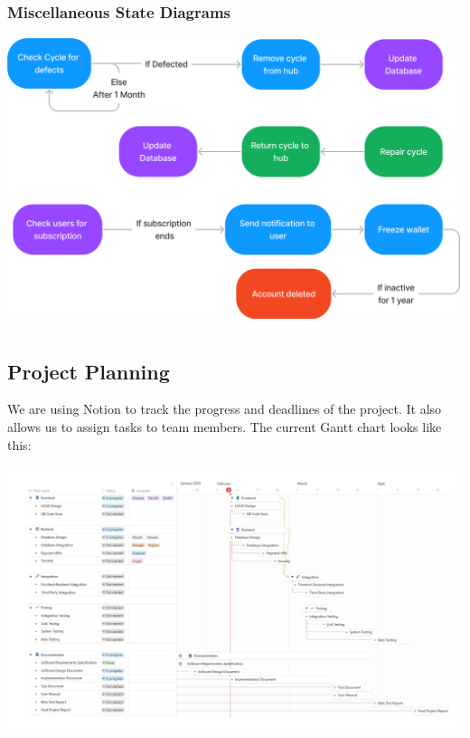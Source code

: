 \documentclass[11pt]{article}
\begin{document}
\subsubsection{Miscellaneous State Diagrams}
\begin{center}
  \includegraphics[scale=0.25]{state-diagram-images/misc.png}
\end{center}

\newpage
\section{}
\subsection{Project Planning}
We are using Notion to track the progress and deadlines of the project. It also allows us to assign tasks to team members. The current Gantt chart looks like this:
\begin{center}
  \includegraphics[scale=0.1]{project-plan-images/notion.png}
\end{center}
\end{document}
